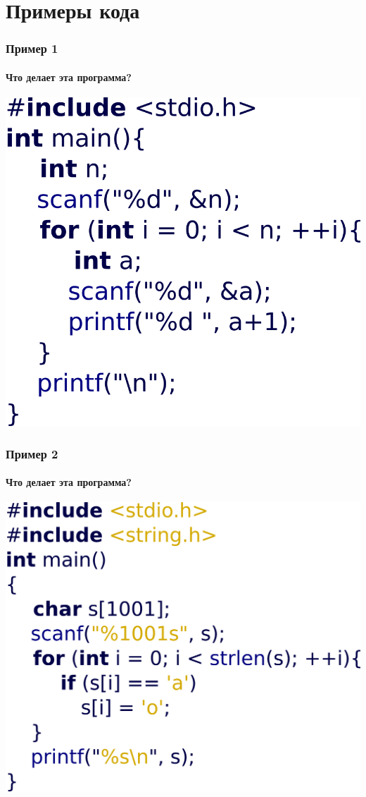 \documentclass[12pt,pdf,hyperref={unicode}]{beamer}
\begin{document}
\section{Примеры кода}

\begin{frame}[fragile]
\frametitle{Пример 1} 
\framesubtitle{Что делает эта программа?}
\begin{center}
\includegraphics[width=0.62\linewidth]{images/example1.png}
\end{center}
\end{frame}

\begin{frame}[fragile]
\frametitle{Пример 2} 
\framesubtitle{Что делает эта программа?}
\begin{center}
\includegraphics[width=0.62\linewidth]{images/example2.png}
\end{center}
\end{frame}
\end{document}
